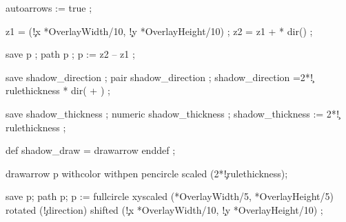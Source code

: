 \stopuseMPgraphic


  autoarrows := true ; %

  z1 = (\simpleslidesPictureParameter\c!x *OverlayWidth/10,
        \simpleslidesPictureParameter\c!y *OverlayHeight/10)   ;
  z2 = z1 +  *
            dir() ;

  save p ; path p ;
  p := z2 -- z1 ;

  \ifcase \simpleslidesShadow \else
  save shadow_direction ; pair shadow_direction ;
  shadow_direction =2*\simpleslidesPictureParameter\c!rulethickness * 
     dir( + 
     \ifcase \simpleslidesShadow {}    \fi ) ;

  save shadow_thickness ; numeric shadow_thickness ;
  shadow_thickness := 2*\simpleslidesPictureParameter\c!rulethickness ;

  def shadow_draw = drawarrow enddef ;

  \fi

  drawarrow p
       withcolor  
       withpen pencircle scaled (2*\simpleslidesPictureParameter\c!rulethickness);

\stopuseMPgraphic


  save p; path p;
  p := fullcircle xyscaled 
       (*OverlayWidth/5,
        *OverlayHeight/5) 
       rotated (\simpleslidesPictureParameter\c!direction) 
       shifted
       (\simpleslidesPictureParameter\c!x *OverlayWidth/10,
        \simpleslidesPictureParameter\c!y *OverlayHeight/10)  ;

